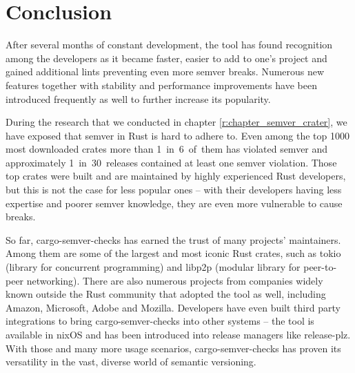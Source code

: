 \documentclass[licencjacka,en]{pracamgr}
\begin{document}
\chapter{Conclusion}\label{r:chapter_conclusion}

After several months of constant development, the tool has found recognition among the developers
as it became faster, easier to add to one's project and gained additional lints preventing
even more semver breaks. Numerous new features together with stability and performance improvements
have been introduced frequently as well to further increase its popularity.

During the research that we conducted in chapter \ref{r:chapter_semver_crater},
we have exposed that semver in Rust is hard to adhere to. Even among the top 1000 most downloaded
crates more than \mbox{1 in 6 of them} has violated semver and approximately \mbox{1 in 30 releases} contained at
least one semver violation. Those top crates were built and are maintained by highly experienced
Rust developers, but this is not the case for less popular ones -- with their developers having
less expertise and poorer semver knowledge, they are even more vulnerable to cause breaks.

So far, cargo-semver-checks has earned the trust of many projects' maintainers. Among them are some
of the largest and most iconic Rust crates, such as tokio (library for concurrent programming)
and libp2p (modular library for peer-to-peer networking). There are also numerous projects from
companies widely known outside the Rust community that adopted the tool as well, including Amazon,
Microsoft, Adobe and Mozilla. Developers have even built third party integrations to bring
cargo-semver-checks into other systems -- the tool is available in nixOS and has been introduced
into release managers like release-plz. With those and many more usage scenarios,
cargo-semver-checks has proven its versatility in the vast, diverse world of semantic versioning.
\end{document}
